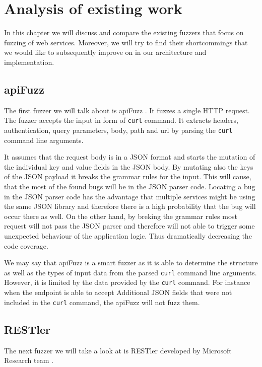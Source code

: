 \chapter{Analysis of existing work}
In this chapter we will discuss and compare the existing fuzzers that focus on fuzzing of web services. \label{sub:Types of fuzzers} Moreover, we will try to find their shortcommings that we would like to subsequently improve on in our architecture and implementation.

\section{apiFuzz}
The first fuzzer we will talk about is apiFuzz \cite{apiFuzz2020github}. It fuzzes a single HTTP request. The fuzzer accepts the input in form of \texttt{curl} command. It extracts headers, authentication, query parameters, body, path and url by parsing the \texttt{curl} command line arguments.

It assumes that the request body is in a JSON format and starts the mutation of the individual key and value fields in the JSON body. By mutating also the keys of the JSON payload it breaks the grammar rules for the input. This will cause, that the most of the found bugs will be in the JSON parser code. Locating a bug in the JSON parser code has the advantage that multiple services might be using the same JSON library and therefore there is a high probability that the bug will occur there as well. On the other hand, by breking the grammar rules most request will not pass the JSON parser and therefore will not able to trigger some unexpected behaviour of the application logic. Thus dramatically decreasing the code coverage.

We may say that apiFuzz is a smart fuzzer as it is able to determine the structure as well as the types of input data from the parsed \texttt{curl} command line arguments. However, it is limited by the data provided by the \texttt{curl} command. For instance when the endpoint is able to accept Additional JSON fields that were not included in the \texttt{curl} command, the apiFuzz will not fuzz them.





\section{RESTler}
The next fuzzer we will take a look at is RESTler developed by Microsoft Research team \cite{atlidakis2019restler}.

